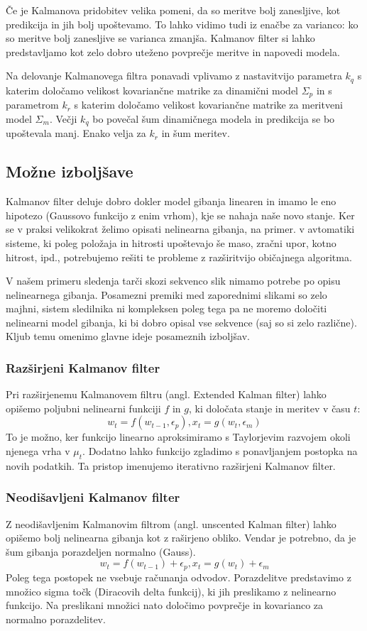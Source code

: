 \documentclass[a4paper]{article}
\begin{document}
Če je Kalmanova pridobitev velika pomeni, da so meritve bolj zanesljive, kot predikcija in jih bolj upoštevamo. To lahko vidimo tudi iz enačbe za varianco: ko so meritve bolj zanesljive se varianca zmanjša. Kalmanov filter si lahko predstavljamo kot zelo dobro uteženo povprečje meritve in napovedi modela.

Na delovanje Kalmanovega filtra ponavadi vplivamo z nastavitvijo parametra $k_q$ s katerim določamo velikost kovariančne matrike za dinamični model $\Sigma_p$ in s parametrom $k_r$ s katerim določamo velikost kovariančne matrike za meritveni model $\Sigma_m$. Večji $k_q$ bo povečal šum dinamičnega modela in predikcija se bo upoštevala manj. Enako velja za $k_r$ in šum meritev. 

\subsection{Možne izboljšave}
Kalmanov filter deluje dobro dokler model gibanja linearen in imamo le eno hipotezo (Gaussovo funkcijo z enim vrhom), kje se nahaja naše novo stanje. Ker se v praksi velikokrat želimo opisati nelinearna gibanja, na primer. v avtomatiki sisteme, ki poleg položaja in hitrosti upoštevajo še maso, zračni upor, kotno hitrost, ipd., potrebujemo rešiti te probleme z razširitvijo običajnega algoritma.

V našem primeru sledenja tarči skozi sekvenco slik nimamo potrebe po opisu nelinearnega gibanja. Posamezni premiki med zaporednimi slikami so zelo majhni, sistem sledilnika ni kompleksen poleg tega pa ne moremo določiti nelinearni model gibanja, ki bi dobro opisal vse sekvence (saj so si zelo različne). Kljub temu omenimo glavne ideje posameznih izboljšav.

\subsubsection{Razširjeni Kalmanov filter}
Pri razširjenemu Kalmanovem filtru (angl. Extended Kalman filter) lahko opišemo poljubni nelinearni funkciji $f$ in $g$, ki določata stanje in meritev v času $t$:
$$
w_t = f(w_{t-1}, \epsilon_p), x_t = g(w_t, \epsilon_m)
$$
To je možno, ker funkcijo linearno aproksimiramo s Taylorjevim razvojem okoli njenega vrha v $\mu_t$. Dodatno lahko funkcijo zgladimo s ponavljanjem postopka na novih podatkih. Ta pristop imenujemo iterativno razširjeni Kalmanov filter.  

\subsubsection{Neodišavljeni Kalmanov filter}
Z neodišavljenim Kalmanovim filtrom (angl. unscented Kalman filter) lahko opišemo bolj nelinearna gibanja kot z raširjeno obliko. Vendar je potrebno, da je šum gibanja porazdeljen normalno (Gauss). 
$$
w_t = f(w_{t-1}) + \epsilon_p, x_t = g(w_t) + \epsilon_m
$$
Poleg tega postopek ne vsebuje računanja odvodov. Porazdelitve predstavimo z množico sigma točk (Diracovih delta funkcij), ki jih preslikamo z nelinearno funkcijo. Na preslikani množici nato določimo povprečje in kovarianco za normalno porazdelitev. 
\end{document}
